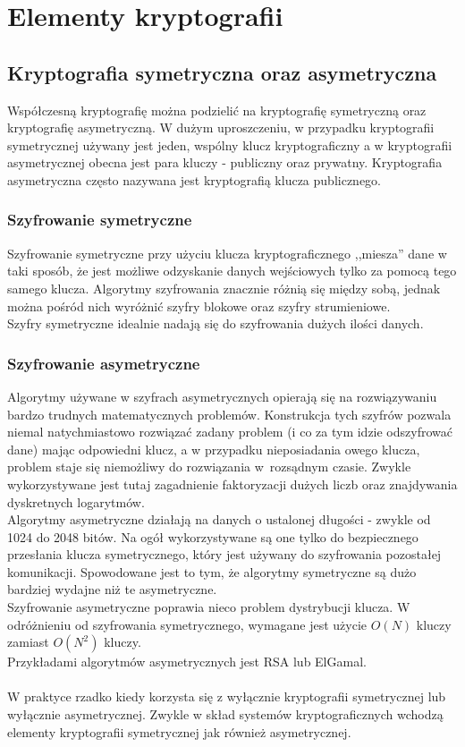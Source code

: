 \chapter{Elementy kryptografii}

\section{Kryptografia symetryczna oraz asymetryczna}
Współczesną kryptografię można podzielić na kryptografię symetryczną oraz kryptografię asymetryczną. 
W dużym uproszczeniu, w przypadku kryptografii symetrycznej używany jest jeden, wspólny klucz kryptograficzny a w kryptografii asymetrycznej obecna jest para kluczy - publiczny oraz prywatny. Kryptografia asymetryczna często nazywana jest kryptografią klucza publicznego. 

\subsection{Szyfrowanie symetryczne}
Szyfrowanie symetryczne przy użyciu klucza kryptograficznego ,,miesza'' dane w taki sposób, 
że jest możliwe odzyskanie danych wejściowych tylko za pomocą tego samego klucza. 
Algorytmy szyfrowania znacznie różnią się między sobą, 
jednak można pośród nich wyróżnić szyfry blokowe oraz szyfry strumieniowe. \\
Szyfry symetryczne idealnie nadają się do szyfrowania dużych ilości danych. 

\subsection{Szyfrowanie asymetryczne}
Algorytmy używane w szyfrach asymetrycznych opierają się na rozwiązywaniu bardzo trudnych matematycznych problemów. 
Konstrukcja tych szyfrów pozwala niemal natychmiastowo rozwiązać zadany problem (i co za tym idzie odszyfrować dane) mając odpowiedni klucz, a w przypadku nieposiadania owego klucza, problem staje się niemożliwy do rozwiązania w~rozsądnym czasie.
Zwykle wykorzystywane jest tutaj zagadnienie faktoryzacji dużych liczb oraz znajdywania dyskretnych logarytmów. \\
Algorytmy asymetryczne działają na danych o ustalonej długości - zwykle od 1024 do 2048 bitów. 
Na ogół wykorzystywane są one tylko do bezpiecznego przesłania klucza symetrycznego, który jest używany do szyfrowania pozostałej komunikacji. 
Spowodowane jest to tym, że algorytmy symetryczne są dużo bardziej wydajne niż te asymetryczne. \\
Szyfrowanie asymetryczne poprawia nieco problem dystrybucji klucza. W odróżnieniu od szyfrowania symetrycznego, wymagane jest użycie $O(N)$ kluczy zamiast $O(N^2)$ \mbox{kluczy}. \\ 
Przykładami algorytmów asymetrycznych jest RSA lub ElGamal. \\ \\
W praktyce rzadko kiedy korzysta się z wyłącznie kryptografii symetrycznej lub wyłącznie asymetrycznej. Zwykle w skład systemów kryptograficznych wchodzą elementy kryptografii symetrycznej jak również asymetrycznej.

